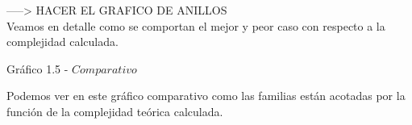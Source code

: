 -----> HACER EL GRAFICO DE ANILLOS\\

Veamos en detalle como se comportan el mejor y peor caso con respecto a la complejidad calculada.\\

  \vspace*{0.3cm} \vspace*{0.3cm}
  \begin{center}
{Gr\'afico 1.5 - $Comparativo$}
  \end{center}
  \vspace*{0.3cm}

Podemos ver en este gr\'afico comparativo como las familias est\'an acotadas por la funci\'on de la complejidad te\'orica calculada.\\

